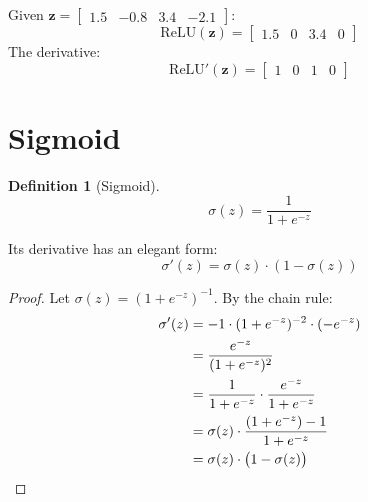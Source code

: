 \documentclass[12pt, a4paper]{report}
\theoremstyle{definition}
\newtheorem{definition}{Definition}[chapter]
\begin{document}
\begin{numexample}
Given $\mathbf{z} = \begin{bmatrix} 1.5 & -0.8 & 3.4 & -2.1 \end{bmatrix}$:
\[
\text{ReLU}(\mathbf{z}) = \begin{bmatrix} 1.5 & 0 & 3.4 & 0 \end{bmatrix}
\]
The derivative:
\[
\text{ReLU}'(\mathbf{z}) = \begin{bmatrix} 1 & 0 & 1 & 0 \end{bmatrix}
\]
\end{numexample}


\section{Sigmoid}

\begin{definition}[Sigmoid]
\begin{equation}
    \sigma(z) = \frac{1}{1 + e^{-z}}
\end{equation}

Its derivative has an elegant form:
\begin{equation}
    \sigma'(z) = \sigma(z) \cdot (1 - \sigma(z))
\end{equation}
\end{definition}

\begin{proof}
Let $\sigma(z) = (1+e^{-z})^{-1}$. By the chain rule:
\begin{align*}
    \sigma'(z) &= -1 \cdot (1+e^{-z})^{-2} \cdot (-e^{-z}) \\
    &= \frac{e^{-z}}{(1+e^{-z})^2} \\
    &= \frac{1}{1+e^{-z}} \cdot \frac{e^{-z}}{1+e^{-z}} \\
    &= \sigma(z) \cdot \frac{(1+e^{-z}) - 1}{1+e^{-z}} \\
    &= \sigma(z) \cdot \bigl(1 - \sigma(z)\bigr) \qedhere
\end{align*}
\end{proof}
\end{document}
